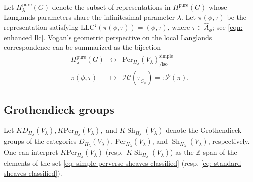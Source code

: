 \documentclass[11pt,letterpaper]{amsart}
\newcommand{\Z}{\mathbb{Z}}
\newcommand{\irrepdual}[1]{\widehat{#1}}
\newcommand{\pure}{\mathrm{pure}}
\newcommand{\LLC}{\mathrm{LLC}}
\newcommand{\Per}{\mathrm{Per}}
\newcommand{\locsys}[2]{\underline{#1}_{#2}}
\renewcommand{\1}{\mathbbm{1}}
\numberwithin{equation}{section}
\begin{document}
{Let $\Pi_{\lambda}^\pure(G)$ denote the subset of representations in $\Pi^\pure(G)$ whose Langlands parameters share the infinitesimal parameter $\lambda$. Let $\pi(\phi,\tau)$ be the representation satisfying $\LLC^{\mathfrak{e}}(\pi(\phi,\tau))=(\phi, \tau)$, where $\tau \in \irrepdual{A}_\phi$; see \eqref{eqn: enhanced llc}. Vogan's geometric perspective on the local Langlands correspondence can be summarized as the bijection
\begin{equation}\label{eqn: vogan langlands correspondence}
    \begin{array}{rcl}
    \Pi_{\lambda}^\pure(G) 
    &\leftrightarrow& \Per_{H_\lambda}(V_\lambda)_{\text{/iso}}^{\text{simple}} \\
    \pi(\phi, \tau) 
    &\mapsto&
    \mathcal{IC}(\locsys{\tau}{C_{\phi}})=:\mathcal{P}(\pi).
\end{array}
\end{equation}
\subsection{Grothendieck groups}\label{subsec: grothendieck groups}
Let $KD_{H_\lambda}(V_\lambda), K\Per_{H_\lambda}(V_\lambda), $ and $ K\operatorname{Sh}_{H_\lambda}(V_\lambda)$ denote the Grothendieck groups of the categories $D_{H_\lambda}(V_\lambda)$, $\Per_{H_\lambda}(V_\lambda)$, and $\operatorname{Sh}_{H_\lambda}(V_\lambda)$, respectively. One can interpret $K\Per_{H_\lambda}(V_\lambda)$ (resp.\ $K\operatorname{Sh}_{H_\lambda}(V_\lambda)$) as the $\Z$-span of the elements of the set \eqref{eq: simple perverse sheaves classified} (resp. \eqref{eq: standard sheaves classified}).

}
\end{document}
